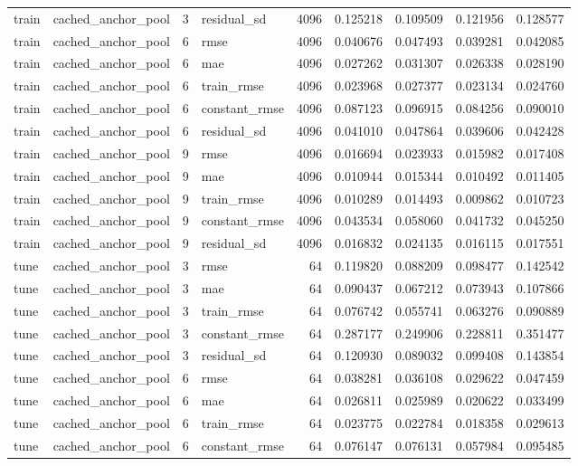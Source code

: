 \begin{tabular}{llrlrrrrr}
train & cached_anchor_pool & 3 & residual_sd & 4096 & 0.125218 & 0.109509 & 0.121956 & 0.128577 \\
train & cached_anchor_pool & 6 & rmse & 4096 & 0.040676 & 0.047493 & 0.039281 & 0.042085 \\
train & cached_anchor_pool & 6 & mae & 4096 & 0.027262 & 0.031307 & 0.026338 & 0.028190 \\
train & cached_anchor_pool & 6 & train_rmse & 4096 & 0.023968 & 0.027377 & 0.023134 & 0.024760 \\
train & cached_anchor_pool & 6 & constant_rmse & 4096 & 0.087123 & 0.096915 & 0.084256 & 0.090010 \\
train & cached_anchor_pool & 6 & residual_sd & 4096 & 0.041010 & 0.047864 & 0.039606 & 0.042428 \\
train & cached_anchor_pool & 9 & rmse & 4096 & 0.016694 & 0.023933 & 0.015982 & 0.017408 \\
train & cached_anchor_pool & 9 & mae & 4096 & 0.010944 & 0.015344 & 0.010492 & 0.011405 \\
train & cached_anchor_pool & 9 & train_rmse & 4096 & 0.010289 & 0.014493 & 0.009862 & 0.010723 \\
train & cached_anchor_pool & 9 & constant_rmse & 4096 & 0.043534 & 0.058060 & 0.041732 & 0.045250 \\
train & cached_anchor_pool & 9 & residual_sd & 4096 & 0.016832 & 0.024135 & 0.016115 & 0.017551 \\
tune & cached_anchor_pool & 3 & rmse & 64 & 0.119820 & 0.088209 & 0.098477 & 0.142542 \\
tune & cached_anchor_pool & 3 & mae & 64 & 0.090437 & 0.067212 & 0.073943 & 0.107866 \\
tune & cached_anchor_pool & 3 & train_rmse & 64 & 0.076742 & 0.055741 & 0.063276 & 0.090889 \\
tune & cached_anchor_pool & 3 & constant_rmse & 64 & 0.287177 & 0.249906 & 0.228811 & 0.351477 \\
tune & cached_anchor_pool & 3 & residual_sd & 64 & 0.120930 & 0.089032 & 0.099408 & 0.143854 \\
tune & cached_anchor_pool & 6 & rmse & 64 & 0.038281 & 0.036108 & 0.029622 & 0.047459 \\
tune & cached_anchor_pool & 6 & mae & 64 & 0.026811 & 0.025989 & 0.020622 & 0.033499 \\
tune & cached_anchor_pool & 6 & train_rmse & 64 & 0.023775 & 0.022784 & 0.018358 & 0.029613 \\
tune & cached_anchor_pool & 6 & constant_rmse & 64 & 0.076147 & 0.076131 & 0.057984 & 0.095485 \\

\end{tabular}
